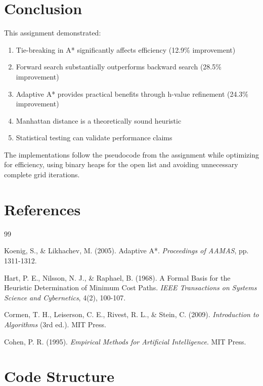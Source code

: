\documentclass[12pt]{article}
\begin{document}
\section{Conclusion}

This assignment demonstrated:

\begin{enumerate}
    \item Tie-breaking in A* significantly affects efficiency (12.9\% improvement)
    \item Forward search substantially outperforms backward search (28.5\% improvement)
    \item Adaptive A* provides practical benefits through h-value refinement (24.3\% improvement)
    \item Manhattan distance is a theoretically sound heuristic
    \item Statistical testing can validate performance claims
\end{enumerate}

The implementations follow the pseudocode from the assignment while optimizing for efficiency, 
using binary heaps for the open list and avoiding unnecessary complete grid iterations.


\section*{References}

\begin{thebibliography}{99}

Koenig, S., \& Likhachev, M. (2005). Adaptive A*. 
\textit{Proceedings of AAMAS}, pp. 1311-1312.

Hart, P. E., Nilsson, N. J., \& Raphael, B. (1968). A Formal Basis for the Heuristic 
Determination of Minimum Cost Paths. 
\textit{IEEE Transactions on Systems Science and Cybernetics}, 4(2), 100-107.

Cormen, T. H., Leiserson, C. E., Rivest, R. L., \& Stein, C. (2009). 
\textit{Introduction to Algorithms} (3rd ed.). MIT Press.

Cohen, P. R. (1995). \textit{Empirical Methods for Artificial Intelligence}. MIT Press.

\end{thebibliography}

\appendix

\section{Code Structure}
\end{document}
